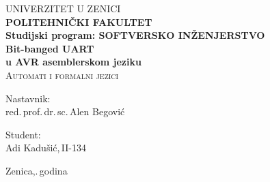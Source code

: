 %
%
\begin{titlepage}
	\begin{center}
		\normalsize{UNIVERZITET U ZENICI}\\
		\textbf{\large{POLITEHNIČKI FAKULTET}}\\
		\textbf{{Studijski program: SOFTVERSKO INŽENJERSTVO}}\\ [9cm]
		\textbf{\huge{Bit-banged UART\\\vspace{0.5ex}u AVR asemblerskom jeziku}}\\
		\textsc{\footnotesize{Automati i formalni jezici}}\\ [9cm]
		\noindent
		\begin{minipage}{0.45\textwidth}
			\begin{flushleft}
				\hspace{1.5 cm}
				\normalsize{Nastavnik:}\\
				red.\,prof.\,dr.\,sc.\,Alen Begović
			\end{flushleft}
		\end{minipage}
		\begin{minipage}{0.45\textwidth}
			\begin{flushright}
				\hspace{2cm}
				\normalsize{Student:\hspace{8mm}\textcolor{white}{.}}\\
			 	Adi Kadušić,\,II-134
			\end{flushright}
		\end{minipage}
		\vfill
		\normalsize{Zenica,\space\the\year.\,godina}
	\end{center}
\end{titlepage}
\newpage